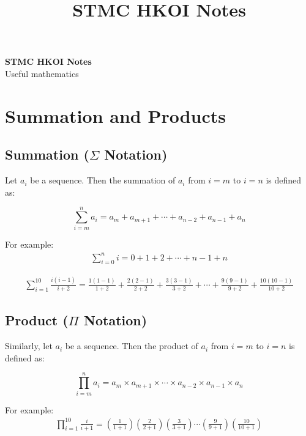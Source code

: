 \documentclass[11pt]{article}
\theoremstyle{definition}
\begin{document}
\title{STMC HKOI Notes}

\thispagestyle{empty}

\begin{center}
{\LARGE \bf STMC HKOI Notes}\\
{\large Useful mathematics}
\end{center}
\section{Summation and Products}
\subsection{Summation ($\Sigma$ Notation)}
Let $a_i$ be a sequence. Then the summation of $a_i$ from $i=m$ to $i=n$ is defined as:

\begin{shaded}
\begin{equation}
    \sum_{i=m}^{n} a_i = a_{m} + a_{m+1} + \cdots + a_{n-2} + a_{n-1} + a_n 
\end{equation} 
\end{shaded}

For example:
\begin{align*}
    \sum_{i=0}^{n} i = 0 + 1 + 2  + \cdots + n-1 + n 
\end{align*}

\begin{align*}
    \sum_{i=1}^{10} \frac{i(i-1)}{i+2} = \frac{1(1-1)}{1+2} + \frac{2(2-1)}{2+2} + \frac{3(3-1)}{3+2} + \cdots + \frac{9(9-1)}{9+2} + \frac{10(10-1)}{10+2}
\end{align*}

\subsection{Product ($\Pi$ Notation)}
Similarly, let $a_i$ be a sequence. Then the product of $a_i$ from $i=m$ to $i=n$ is defined as:
\begin{shaded}
    \begin{equation}
        \prod_{i=m}^{n} a_i = a_{m} \times a_{m+1} \times \cdots \times a_{n-2} \times a_{n-1} \times a_n 
    \end{equation} 
\end{shaded}
For example:
\begin{align*}
    \prod_{i=1}^{10} \frac{i}{i+1} = \left(\frac{1}{1+1}\right) \left(\frac{2}{2+1}\right) \left(\frac{3}{3+1}\right) \cdots \left(\frac{9}{9+1}\right) \left(\frac{10}{10+1}\right)
\end{align*}
\end{document}
